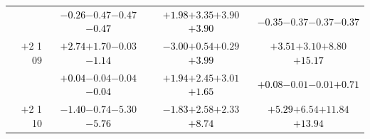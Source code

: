 \documentclass[compress]{beamer}
\begin{document}
\begin{frame}
\begin{tabular}{r | c | c | c}
          & \textcolor{black}{$-0.26$}\hspace{0.1 cm}$-0.47$\hspace{0.1 cm}$-0.47$\hspace{0.1 cm}\textcolor{black}{$-0.47$} & \textcolor{black}{$+1.98$}\hspace{0.1 cm}$+3.35$\hspace{0.1 cm}$+3.90$\hspace{0.1 cm}\textcolor{black}{$+3.90$} & \textcolor{black}{$-0.35$}\hspace{0.1 cm}$-0.37$\hspace{0.1 cm}$-0.37$\hspace{0.1 cm}\textcolor{black}{$-0.37$} \\
$+$2 1 09 & \textcolor{black}{$+2.74$}\hspace{0.1 cm}$+1.70$\hspace{0.1 cm}$-0.03$\hspace{0.1 cm}\textcolor{black}{$-1.14$} & \textcolor{black}{$-3.00$}\hspace{0.1 cm}$+0.54$\hspace{0.1 cm}$+0.29$\hspace{0.1 cm}\textcolor{black}{$+3.99$} & \textcolor{black}{$+3.51$}\hspace{0.1 cm}$+3.10$\hspace{0.1 cm}$+8.80$\hspace{0.1 cm}\textcolor{black}{$+15.17$} \\
          & \textcolor{black}{$+0.04$}\hspace{0.1 cm}$-0.04$\hspace{0.1 cm}$-0.04$\hspace{0.1 cm}\textcolor{black}{$-0.04$} & \textcolor{black}{$+1.94$}\hspace{0.1 cm}$+2.45$\hspace{0.1 cm}$+3.01$\hspace{0.1 cm}\textcolor{black}{$+1.65$} & \textcolor{black}{$+0.08$}\hspace{0.1 cm}$-0.01$\hspace{0.1 cm}$-0.01$\hspace{0.1 cm}\textcolor{black}{$+0.71$} \\
$+$2 1 10 & \textcolor{black}{$-1.40$}\hspace{0.1 cm}$-0.74$\hspace{0.1 cm}$-5.30$\hspace{0.1 cm}\textcolor{black}{$-5.76$} & \textcolor{black}{$-1.83$}\hspace{0.1 cm}$+2.58$\hspace{0.1 cm}$+2.33$\hspace{0.1 cm}\textcolor{black}{$+8.74$} & \textcolor{black}{$+5.29$}\hspace{0.1 cm}$+6.54$\hspace{0.1 cm}$+11.84$\hspace{0.1 cm}\textcolor{black}{$+13.94$} \\

\end{tabular}
\end{frame}
\end{document}
